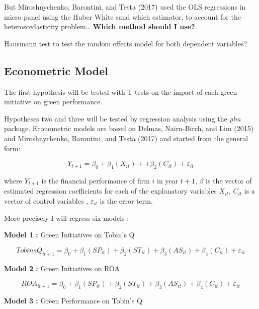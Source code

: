 \documentclass[12pt,]{article}
\begin{document}
But Miroshnychenko, Barontini, and Testa (2017) used the OLS regressions
in micro panel using the Huber-White sand which estimator, to account
for the heteroscedasticity problem\ldots{} \textbf{Which method should I
use?}

Hausmann test to test the random effects model for both dependent
variables?

\newpage

\subsection{Econometric Model}\label{econometric-model}

The first hypothesis will be tested with T-tests on the impact of each
green initiative on green performance.

Hypotheses two and three will be tested by regression analysis using the
\emph{plm} package. Econometric models are based on Delmas, Nairn-Birch,
and Lim (2015) and Miroshnychenko, Barontini, and Testa (2017) and
started from the general form:

\begin{equation}
Y_{t+1}=\beta_{0} + \beta_{1} (X_{it}) + + \beta_{2} (C_{it}) + \varepsilon_{it}
\label{GeneralForm}
\end{equation}

where \(Y_{t+1}\) is the financial performance of firm \(i\) in year
\(t+1\), \(\beta\) is the vector of estimated regression coefficients
for each of the explanatory variables \(X_{it}\), \(C_{it}\) is a vector
of control variables , \(\varepsilon_{it}\) is the error term.

More precisely I will regress six models :

\textbf{Model 1 :} Green Initiatives on Tobin's Q

\begin{equation}
TobinsQ_{it+1} = \beta_{0} + \beta_{1} (SP_{it}) + \beta_{2} (ST_{it}) + \beta_{3} (AS_{it}) + \beta_{4} (C_{it}) + \varepsilon_{it}
\label{M1}
\end{equation}

\textbf{Model 2 :} Green Initiatives on ROA

\begin{equation}
ROA_{it+1} = \beta_{0} + \beta_{1} (SP_{it}) + \beta_{2} (ST_{it}) + \beta_{3} (AS_{it}) + \beta_{4} (C_{it}) + \varepsilon_{it}
\label{M2}
\end{equation}

\textbf{Model 3 :} Green Performance on Tobin's Q
\end{document}
